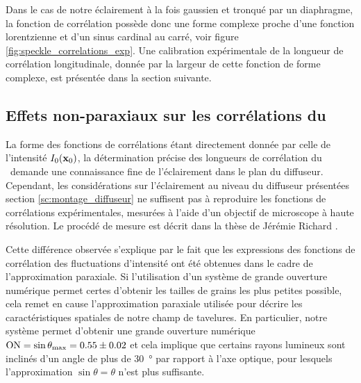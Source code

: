 Dans le cas de notre éclairement à la fois gaussien et tronqué par un diaphragme, la fonction de corrélation possède donc une forme complexe proche d'une fonction lorentzienne et d'un sinus cardinal au carré, voir figure \ref{fig:speckle_correlations_exp}. Une calibration expérimentale de la longueur de corrélation longitudinale, donnée par la largeur de cette fonction de forme complexe, est présentée dans la section suivante.


















\subsection{Effets non-paraxiaux sur les corrélations du \speckle\ }
\label{sc:speckle_non_paraxial}

La forme des fonctions de corrélations étant directement donnée par celle de l'intensité $I_0(\mathbf{x}_0)$, la détermination précise des longueurs de corrélation du \speckle\ demande une connaissance fine de l'éclairement dans le plan du diffuseur. Cependant, les considérations sur l'éclairement au niveau du diffuseur présentées section \ref{sc:montage_diffuseur} ne suffisent pas à reproduire les fonctions de corrélations expérimentales, mesurées à l'aide d'un objectif de microscope à haute résolution. Le procédé de mesure est décrit dans la thèse de Jérémie Richard \citep{richard2015propagation}. 

Cette différence observée s'explique par le fait que les expressions des fonctions de corrélation des fluctuations d'intensité ont été obtenues dans le cadre de l'approximation paraxiale. Si l'utilisation d'un système de grande ouverture numérique permet certes d'obtenir les tailles de grains les plus petites possible, cela remet en cause l'approximation paraxiale utilisée pour décrire les caractéristiques spatiales de notre champ de tavelures. En particulier, notre système permet d'obtenir une grande ouverture numérique $\mathrm{ON}=\sin{\theta_{\mathrm{max}}}=0.55\pm 0.02$ et cela implique que certains rayons lumineux sont inclinés d'un angle de plus de \SI{30}{\degree} par rapport à l'axe optique, pour lesquels l'approximation $\sin{\theta}=\theta$ n'est plus suffisante.

